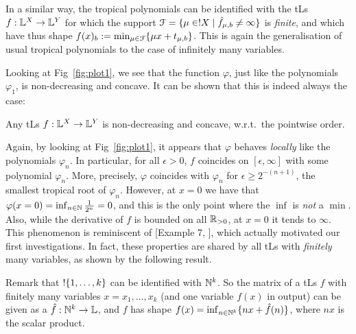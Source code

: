  In a similar way, the tropical polynomials can be identified with the tLs
$f:\mathbb{L}^X\to\mathbb{L}^Y$ 
 for which the support $\mathcal{F}=\{\mu\in!X\mid\hat{f}_{\mu,b}\neq\infty\}$ is \emph{finite}, and which have thus shape $f(x)_b:=\min_{\mu\in\mathcal{F}} \{\mu x+ t_{\mu,b}\}$.
 This is again the generalisation of usual tropical polynomials to the case of infinitely many variables.

% 

Looking at Fig~\ref{fig:plot1}, we see that the function $\varphi$, just like the polynomials $\varphi_{1}$, is non-decreasing and concave.
It can be shown that this is indeed always the case:

\begin{proposition}\label{prop:nondecr+conc}
 Any tLs $f:\mathbb{L}^X\to\mathbb{L}^Y$ is non-decreasing and concave, w.r.t.\ the pointwise order.
\end{proposition}

Again, by looking at Fig~\ref{fig:plot1}, it appears that $\varphi$ behaves \emph{locally} like the polynomials $\varphi_{n}$. In particular, for all $\epsilon >0$, $f$ coincides on $[\epsilon,\infty]$ with some polynomial $\varphi_{n}$. More, precisely, $\varphi$ coincides with $\varphi_{n}$ 
for $\epsilon \geq 2^{-(n+1)}$, the smallest tropical root of $\varphi_{n}$.
However, at
%
 $x=0$ we have that $\varphi(x=0)=\inf_{n\in\mathbb{N}} \frac{1}{2^n}=0$, and this is the only point where the $\inf$ is \emph{not} a $\min$.
Also, while the derivative of $f$ is bounded on all $\mathbb{R}_{>0}$, at $x=0$ it tends to $\infty$.
This phenomenon is reminiscent of [Example 7, \cite{Ehrhard2005}],
which actually motivated our first investigations.
In fact, these properties are shared by all tLs with \emph{finitely} many variables, as shown by the following result.


Remark that $!\{1,\dots,k\}$ can be identified with $\mathbb{N}^k$.
So the matrix of a tLs $f$ with finitely many variables $x=x_1,\dots,x_k$ (and one variable $f(x)$ in output) can be given as a $\hat{f}:\mathbb{N}^k\to\mathbb{L}$, and $f$ has shape $f(x)=\inf_{n\in \mathbb{N}^k}\{nx+\hat{f}(n)\}$, where $nx$ is the scalar product.

